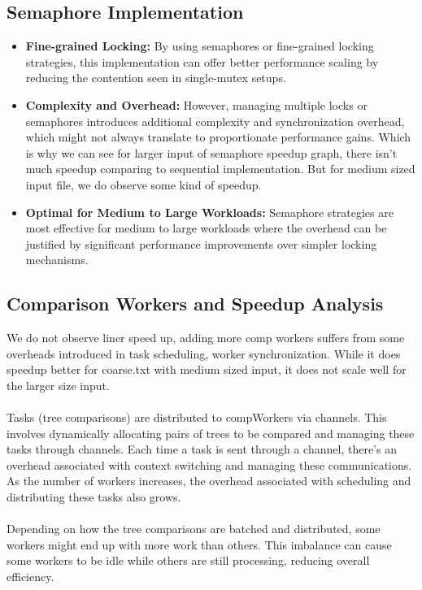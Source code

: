 \documentclass[letterpaper,12pt]{article}
\theoremstyle{remark}
\begin{document}
\subsection{Semaphore Implementation}
\begin{itemize}
    \item \textbf{Fine-grained Locking:} By using semaphores or fine-grained locking strategies, this implementation can offer better performance scaling by reducing the contention seen in single-mutex setups.
    \item \textbf{Complexity and Overhead:} However, managing multiple locks or semaphores introduces additional complexity and synchronization overhead, which might not always translate to proportionate performance gains. Which is why we can see for larger input of semaphore speedup graph, there isn't much speedup comparing to sequential implementation. But for medium sized input file, we do observe some kind of speedup.
    \item \textbf{Optimal for Medium to Large Workloads:} Semaphore strategies are most effective for medium to large workloads where the overhead can be justified by significant performance improvements over simpler locking mechanisms.
\end{itemize}

\subsection{Comparison Workers and Speedup Analysis}
We do not observe liner speed up, adding more comp workers suffers from some overheads introduced in task scheduling, worker synchronization. While it does speedup better for coarse.txt with medium sized input, it does not scale well for the larger size input. \\\\
Tasks (tree comparisons) are distributed to compWorkers via channels. This involves dynamically allocating pairs of trees to be compared and managing these tasks through channels. Each time a task is sent through a channel, there's an overhead associated with context switching and managing these communications. As the number of workers increases, the overhead associated with scheduling and distributing these tasks also grows.\\\\
Depending on how the tree comparisons are batched and distributed, some workers might end up with more work than others. This imbalance can cause some workers to be idle while others are still processing, reducing overall efficiency.
\end{document}
